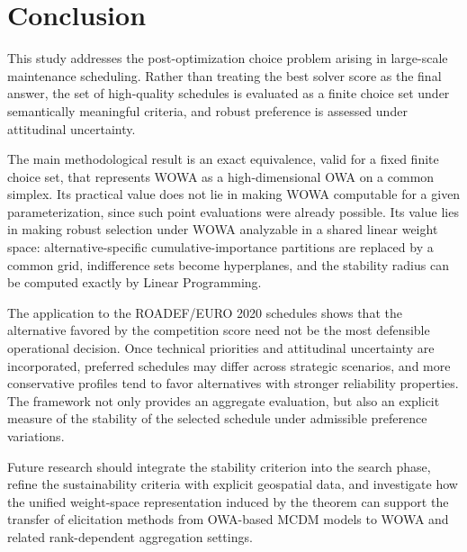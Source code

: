 \section{Conclusion}
This study addresses the post-optimization choice problem arising in large-scale maintenance scheduling. Rather than treating the best solver score as the final answer, the set of high-quality schedules is evaluated as a finite choice set under semantically meaningful criteria, and robust preference is assessed under attitudinal uncertainty.

The main methodological result is an exact equivalence, valid for a fixed finite choice set, that represents WOWA as a high-dimensional OWA on a common simplex. Its practical value does not lie in making WOWA computable for a given parameterization, since such point evaluations were already possible. Its value lies in making robust selection under WOWA analyzable in a shared linear weight space: alternative-specific cumulative-importance partitions are replaced by a common grid, indifference sets become hyperplanes, and the stability radius can be computed exactly by Linear Programming.

The application to the ROADEF/EURO 2020 schedules shows that the alternative favored by the competition score need not be the most defensible operational decision. Once technical priorities and attitudinal uncertainty are incorporated, preferred schedules may differ across strategic scenarios, and more conservative profiles tend to favor alternatives with stronger reliability properties. The framework not only provides an aggregate evaluation, but also an explicit measure of the stability of the selected schedule under admissible preference variations.

Future research should integrate the stability criterion into the search phase, refine the sustainability criteria with explicit geospatial data, and investigate how the unified weight-space representation induced by the theorem can support the transfer of elicitation methods from OWA-based MCDM models to WOWA and related rank-dependent aggregation settings.
